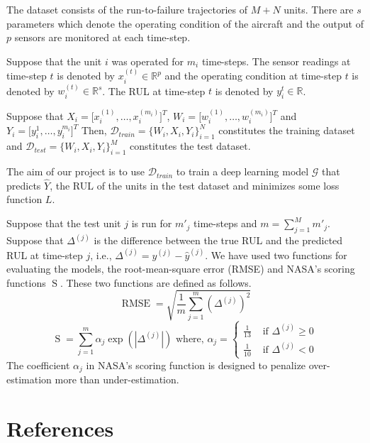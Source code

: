 \documentclass[a4paper,12pt]{article}
\DeclareMathOperator{\rmse}{RMSE}
\DeclareMathOperator{\nasa}{S}
\begin{document}
The dataset consists of the run-to-failure trajectories of $M+N$ units. There
are $s$ parameters which denote the operating condition of the aircraft and the
output of $p$ sensors are monitored at each time-step.

Suppose that the unit $i$ was operated for $m_i$ time-steps. The sensor
readings at time-step $t$ is denoted by $x_{i}^{(t)} \in \mathbb{R}^{p}$ and the
operating condition at time-step $t$ is denoted by
$w_{i}^{(t)} \in \mathbb{R}^{s}$. The RUL at time-step $t$ is denoted by
$y_{i}^{t} \in \mathbb{R}$.

Suppose that $X_i = \lbrack x_{i}^{(1)}, \ldots, x_{i}^{(m_i)} \rbrack^{T}$,
$W_i = \lbrack w_{i}^{(1)}, \ldots, w_{i}^{(m_i)} \rbrack^{T}$ and
$Y_i = \lbrack y_{i}^{1}, \ldots, y_{i}^{m_i} \rbrack^{T}$ Then,
$\mathcal{D}_{train} = \{W_i, X_i, Y_i\}_{i=1}^{N}$ constitutes the training
dataset and $\mathcal{D}_{test} = \{W_i, X_i, Y_i\}_{i=1}^{M}$ constitutes the
test dataset.

The aim of our project is to use $\mathcal{D}_{train}$ to train a deep learning
model $\mathcal{G}$ that predicts $\hat{Y}$, the RUL of the units in the test
dataset and minimizes some loss function $L$.

Suppose that the test unit $j$ is run for $m'_{j}$ time-steps and
$m = \sum_{j=1}^{M} m'_{j}$. Suppose that $\Delta^{(j)}$ is the difference
between the true RUL and the predicted RUL at time-step $j$, i.e.,
$\Delta^{(j)} = y^{(j)} - \hat{y}^{(j)}$. We have used two functions for
evaluating the models, the root-mean-square error (RMSE) and NASA's scoring
functions $\nasa$. These two functions are defined as follows.
\[ \rmse = \sqrt{\frac{1}{m}\sum_{j=1}^{m}(\Delta^{(j)})^2} \]
\[ \nasa = \sum_{j=1}^{m}\alpha_{j}\exp(|\Delta^{(j)}|) \mbox{ where, } \alpha_{j} = 
\left\{ \begin{array}{ll}
\frac{1}{13} & \mbox{ if } \Delta^{(j)} \geq 0 \\
\frac{1}{10} & \mbox{ if } \Delta^{(j)} < 0 \end{array} \right.\]
The coefficient $\alpha_{j}$ in NASA's scoring function is designed to penalize
over-estimation more than under-estimation.





\section*{References}
\end{document}
